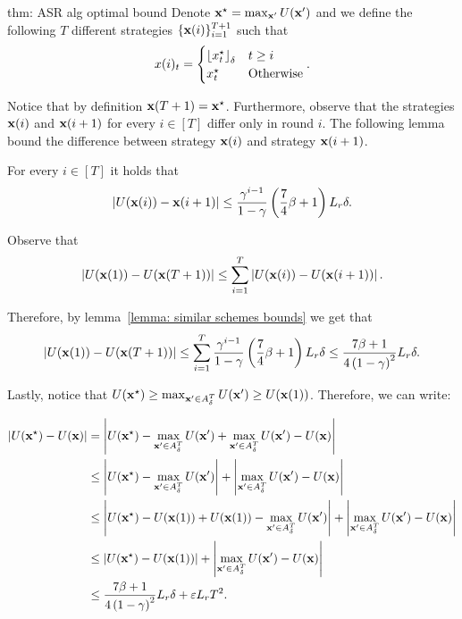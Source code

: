 \begin{proofof}{thm: ASR alg optimal bound}
Denote ${\bf{x}}^\star = \max_{{\bf{x}}'} U({\bf{x}}')$ and we define the following $T$ different strategies $\{ {\bf{x}}(i) \}_{i = 1}^{T+1}$ such that
\begin{align*}
    x(i)_t = \begin{cases}
        {\left\lfloor x^\star_t\right\rfloor_{\delta}} & \mbox{$t \geq i$} \\
        x^\star_t & \mbox{Otherwise}
    \end{cases}.
\end{align*}

Notice that by definition ${\bf{x}}(T+1) = {\bf{x}}^\star$. Furthermore, observe that the strategies ${\bf{x}}(i)$ and ${\bf{x}}(i+1)$ for every $i \in [T]$ differ only in round $i$. The following lemma bound the difference between strategy ${\bf{x}}(i)$ and strategy ${\bf{x}}(i+1)$.

\begin{lemma} \label{lemma: similar schemes bounds}
For every $i \in [T]$ it holds that
\begin{align*}
\left| U({\bf{x}}(i)) - {\bf{x}}(i+1) \right| \leq \frac{\gamma^{i - 1}}{1-\gamma} \left(\frac{7}{4}\beta + 1\right) L_r \delta.
\end{align*}
\end{lemma}

Observe that 
\begin{align*}
\left| U({\bf{x}}(1)) - U({\bf{x}}(T+1)) \right| \leq \sum_{i = 1}^T \left| U({\bf{x}}(i)) - U({\bf{x}}(i+1)) \right|.
\end{align*}

Therefore, by lemma~\ref{lemma: similar schemes bounds} we get that
\begin{align*}
\left| U({\bf{x}}(1)) - U({\bf{x}}(T+1)) \right| \leq \sum_{i = 1}^T \frac{\gamma^{i - 1}}{1-\gamma} \left(\frac{7}{4}\beta + 1\right) L_r \delta \leq \frac{7\beta + 1}{4\left(1-\gamma \right)^2}  L_r \delta.
\end{align*}

Lastly, notice that $U({\bf{x}}^\star) \geq \max_{{\bf{x}}' \in A_\delta^T} U({\bf{x}}') \geq U({\bf{x}}(1))$. Therefore, we can write:

\begin{align*}
\left| U({\bf{x}}^\star) - U({\bf{x}}) \right| &= \left| U({\bf{x}}^\star) - \max_{{\bf{x}}' \in A_\delta^T} U({\bf{x}}') + \max_{{\bf{x}}' \in A_\delta^T} U({\bf{x}}') - U({\bf{x}}) \right| \\
&\leq \left| U({\bf{x}}^\star) - \max_{{\bf{x}}' \in A_\delta^T} U({\bf{x}}') \right| + \left| \max_{{\bf{x}}' \in A_\delta^T} U({\bf{x}}') - U({\bf{x}}) \right| \\
&\leq \left| U({\bf{x}}^\star) - U({\bf{x}}(1)) + U({\bf{x}}(1)) - \max_{{\bf{x}}' \in A_\delta^T} U({\bf{x}}') \right| + \left| \max_{{\bf{x}}' \in A_\delta^T} U({\bf{x}}') - U({\bf{x}}) \right| \\
&\leq \left| U({\bf{x}}^\star) - U({\bf{x}}(1)) \right| + \left| \max_{{\bf{x}}' \in A_\delta^T} U({\bf{x}}') - U({\bf{x}}) \right| \\
&\leq \frac{7\beta + 1}{4\left(1-\gamma \right)^2}  L_r \delta + \varepsilon L_r T^2.
\end{align*}


\end{proofof}
